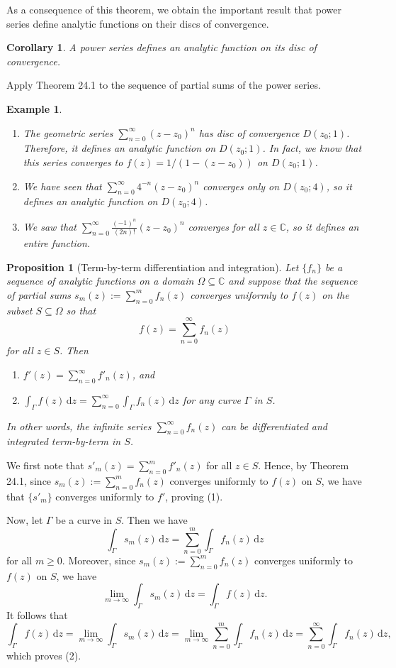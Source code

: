 \documentclass[10pt]{article}
\makeatletter
\newcommand{\C}{\mathbb{C}}
\newcommand{\dd}{\,\mathrm{d}}
\theoremstyle{newstyle}
\newtheorem{cor}[thm]{Corollary}
\newtheorem{prop}[thm]{Proposition}
\newtheorem{exmp}[thm]{Example}
\newenvironment{pf}[1][\proofname]{\par
  \pushQED{\qed}%
  \normalfont \topsep0\p@\relax
  \trivlist
  \item[\hskip\labelsep\scshape
  #1\@addpunct{.}]\ignorespaces
}{%
  \popQED\endtrivlist\@endpefalse
}
\makeatother
\begin{document}
As a consequence of this theorem, we obtain the important result that power series 
define analytic functions on their discs of convergence. 

\begin{cor}
A power series defines an analytic function on its disc of convergence.
\end{cor}
\begin{pf}
Apply Theorem 24.1 to the sequence of partial sums of the power series.
\end{pf}

\newpage 
\begin{exmp}~
\begin{enumerate}[(1)]
    \item The geometric series $\sum_{n=0}^\infty (z-z_0)^n$ has disc of convergence $D(z_0; 1)$. 
    Therefore, it defines an analytic function on $D(z_0; 1)$. In fact, we know that this series 
    converges to $f(z) = 1/(1-(z-z_0))$ on $D(z_0; 1)$. 
    \item We have seen that $\sum_{n=0}^\infty 4^{-n}(z-z_0)^n$ converges only on $D(z_0; 4)$, 
    so it defines an analytic function on $D(z_0; 4)$. 
    \item We saw that $\sum_{n=0}^\infty \frac{(-1)^n}{(2n)!}(z-z_0)^n$ converges for all 
    $z \in \C$, so it defines an entire function. 
\end{enumerate}
\end{exmp}

\begin{prop}[Term-by-term differentiation and integration]
Let $\{f_n\}$ be a sequence of analytic functions on a domain $\Omega \subseteq \C$ and suppose that 
the sequence of partial sums $s_m(z) := \sum_{n=0}^m f_n(z)$ converges uniformly to $f(z)$ on the 
subset $S \subseteq \Omega$ so that 
\[ f(z) = \sum_{n=0}^\infty f_n(z) \]
for all $z \in S$. Then 
\begin{enumerate}[(1)]
    \item $f'(z) = \sum_{n=0}^\infty f'_n(z)$, and 
    \item $\int_\Gamma f(z)\dd z = \sum_{n=0}^\infty \int_\Gamma 
    f_n(z) \dd z$ for any curve $\Gamma$ in $S$. 
\end{enumerate}
In other words, the infinite series $\sum_{n=0}^\infty f_n(z)$ can be differentiated and 
integrated term-by-term in $S$. 
\end{prop}
\begin{pf}
We first note that $s'_m(z) = \sum_{n=0}^m f'_n(z)$ for all $z \in S$. Hence, by Theorem 24.1, 
since $s_m(z) := \sum_{n=0}^m f_n(z)$ converges uniformly to $f(z)$ on $S$, we have that 
$\{s'_m\}$ converges uniformly to $f'$, proving (1).

Now, let $\Gamma$ be a curve in $S$. Then we have 
\[ \int_\Gamma s_m(z) \dd z = \sum_{n=0}^m \int_\Gamma f_n(z) \dd z \]
for all $m \geq 0$. Moreover, since $s_m(z) := \sum_{n=0}^m f_n(z)$ converges uniformly to 
$f(z)$ on $S$, we have 
\[ \lim_{m\to\infty} \int_\Gamma s_m(z)\dd z = \int_\Gamma f(z)\dd z. \]
It follows that 
\[ \int_\Gamma f(z)\dd z = \lim_{m\to\infty} \int_\Gamma s_m(z)\dd z = \lim_{m\to\infty}
\sum_{n=0}^m \int_\Gamma f_n(z) \dd z = \sum_{n=0}^\infty \int_\Gamma f_n(z)\dd z, \]
which proves (2). 
\end{pf}
\end{document}
